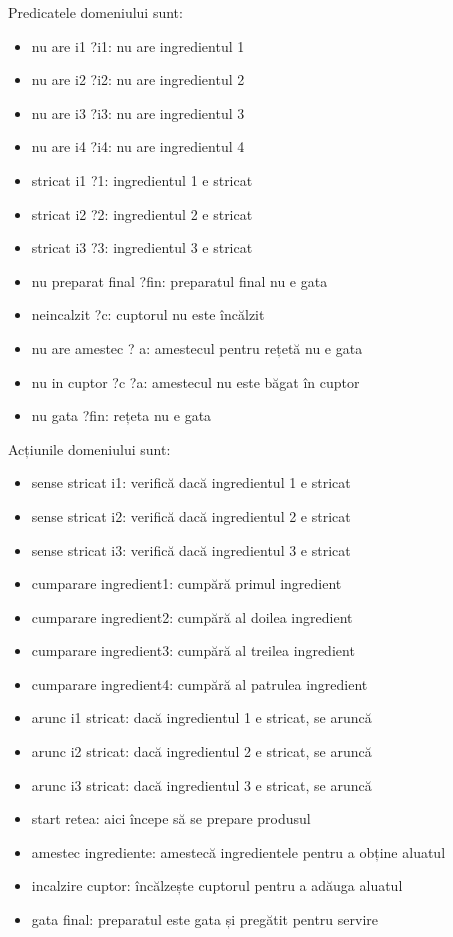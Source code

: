 Predicatele domeniului sunt:
 \begin{itemize}
    \setlength\itemsep{0em}
    \item nu are i1 ?i1: nu are ingredientul 1
    \item nu are i2 ?i2: nu are ingredientul 2
    \item nu are i3 ?i3: nu are ingredientul 3
    \item nu are i4 ?i4: nu are ingredientul 4
    \item stricat i1 ?1: ingredientul 1 e stricat
      \item stricat i2 ?2: ingredientul 2 e stricat
        \item stricat i3 ?3: ingredientul 3 e stricat
       
    \item nu preparat final ?fin: preparatul final nu e gata
    \item neincalzit ?c: cuptorul nu este încălzit
    \item nu are amestec ? a: amestecul pentru rețetă nu e gata
    \item nu in cuptor ?c ?a: amestecul nu este băgat în cuptor
    \item nu gata ?fin: rețeta nu e gata
  


\end{itemize}
Acțiunile domeniului sunt:

 \begin{itemize}
    \setlength\itemsep{0em}
    \item sense stricat i1: verifică dacă ingredientul 1 e stricat
        \item sense stricat i2: verifică dacă ingredientul 2 e stricat
            \item sense stricat i3: verifică dacă ingredientul 3 e stricat
    \item cumparare ingredient1: cumpără primul ingredient
    \item cumparare ingredient2: cumpără al doilea ingredient
    \item cumparare ingredient3: cumpără al treilea ingredient
    \item cumparare ingredient4: cumpără al patrulea ingredient
    \item arunc i1 stricat: dacă ingredientul 1 e stricat, se aruncă
       \item arunc i2 stricat: dacă ingredientul 2 e stricat, se aruncă
          \item arunc i3 stricat: dacă ingredientul 3 e stricat, se aruncă
    \item start retea: aici începe să se prepare produsul
    \item amestec ingrediente: amestecă ingredientele pentru a obține aluatul
    \item incalzire cuptor: încălzește cuptorul pentru a adăuga aluatul
    \item  gata final: preparatul este gata și pregătit pentru servire
    
\end{itemize}


